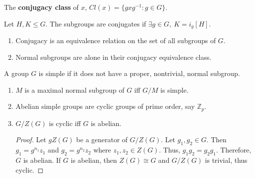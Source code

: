 \begin{definition}
	The \textbf{conjugacy class} of $x$, $Cl(x) = \{ gxg^{-1} : g \in G\}$.
\end{definition}

\begin{definition}
	Let $H,K \le G$. The subgroups are conjugates if $\exists g \in G,\ K=i_g[H]$.
\end{definition}
\begin{enumerate}
	\item Conjugacy is an equivalence relation on the set of all subgroups of $G$.
	\item Normal subgroups are alone in their conjugacy equivalence class.
\end{enumerate}

\begin{definition}
	A group $G$ is simple if it does not have a proper, nontrivial, normal subgroup.
\end{definition}

\begin{enumerate}
	\item $M$ is a maximal normal subgroup of $G$ iff $G/M$ is simple.
	\item Abelian simple groups are cyclic groups of prime order, say $\mathbb{Z}_p$.
	\item $G/Z(G)$ is cyclic iff $G$ is abelian.
	\begin{proof}
		Let $gZ(G)$ be a generator of $G/Z(G)$. Let $g_1,g_2 \in G$. Then $g_1 = g^{n_1}z_1$ and $g_2 = g^{n_2}z_2$ where $z_1,z_2 \in Z(G)$.
		Thus, $g_1g_2 = g_2g_1$. Therefore, $G$ is abelian.
		If $G$ is abelian, then $Z(G) \cong G$ and $G/Z(G)$ is trivial, thus cyclic.
	\end{proof}
\end{enumerate}

